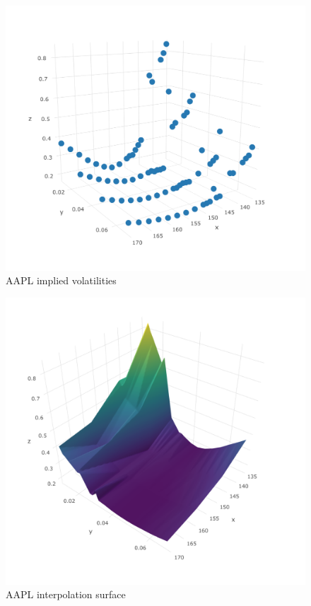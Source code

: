 \documentclass{article}
\begin{document}
\begin{figure}[h] 
\begin{center} 
\includegraphics[width = 12cm]{smile.png}  
\caption{AAPL implied volatilities} 
\end{center} 
\end{figure}

\begin{figure}[h] 
\begin{center} 
\includegraphics[width = 12cm]{int2.png}  
\caption{AAPL interpolation surface} 
\end{center} 
\end{figure}
\end{document}
